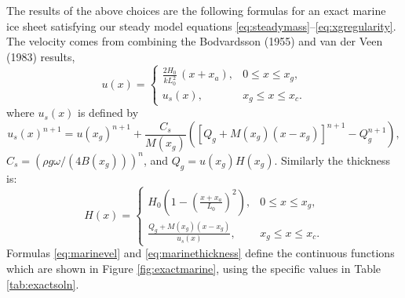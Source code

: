 \documentclass[review,letterpaper]{igs}
\begin{document}
The results of the above choices are the following formulas for an exact marine ice sheet satisfying our steady model equations \eqref{eq:steadymass}--\eqref{eq:xgregularity}.  The velocity comes from combining the Bodvardsson (1955) and van der Veen (1983) results,
\begin{equation}
u(x) = \begin{cases} \frac{2 H_0}{k L_0^2}\,(x + x_a), & 0 \le x \le x_g, \\
                     u_s(x), & x_g \le x \le x_c.
       \end{cases} \label{eq:marinevel}
\end{equation}
where $u_s(x)$ is defined by
\begin{equation}
u_s(x)^{n+1} = u(x_g)^{n+1} + \frac{C_s}{M(x_g)} \left(\left[Q_g + M(x_g) (x-x_g)\right]^{n+1} - Q_g^{n+1}\right), \label{eq:vanderveenvel}
\end{equation}
$C_s = \left(\rho g \omega/(4 B(x_g))\right)^n$, and $Q_g = u(x_g) H(x_g)$.  Similarly the thickness is:
\begin{equation}
H(x) = \begin{cases} H_0 \left(1 - (\frac{x+x_a}{L_0})^2\right), & 0 \le x \le x_g, \\
                     \frac{Q_g + M(x_g) (x-x_g)}{u_s(x)}, & x_g \le x \le x_c.
       \end{cases} \label{eq:marinethickness}
\end{equation}
Formulas \eqref{eq:marinevel} and \eqref{eq:marinethickness} define the continuous functions which are shown in Figure \ref{fig:exactmarine}, using the specific values in Table \ref{tab:exactsoln}.
\end{document}
